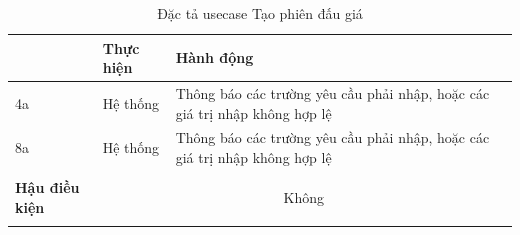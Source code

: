 \documentclass{article}
\begin{document}
\begin{longtable}{| p{} | p{} | p{} | p{} |}
{        \begin{tabular}{| p{} | p{} | p{} |} 
            \hline
                \bfseries STT & \bfseries Thực hiện &  \bfseries Hành động \\\hline
                4a & Hệ thống & Thông báo các trường yêu cầu phải nhập, hoặc các giá trị nhập không hợp lệ \\\hline
                8a & Hệ thống & Thông báo các trường yêu cầu phải nhập, hoặc các giá trị nhập không hợp lệ \\\hline
        \end{tabular}
        }\\\hline
        \bfseries Hậu điều kiện & \multicolumn{3}{c|}{Không}\\\hline
    \caption{Đặc tả usecase Tạo phiên đấu giá}
    \label{bang22}
    \end{longtable}
\end{document}
